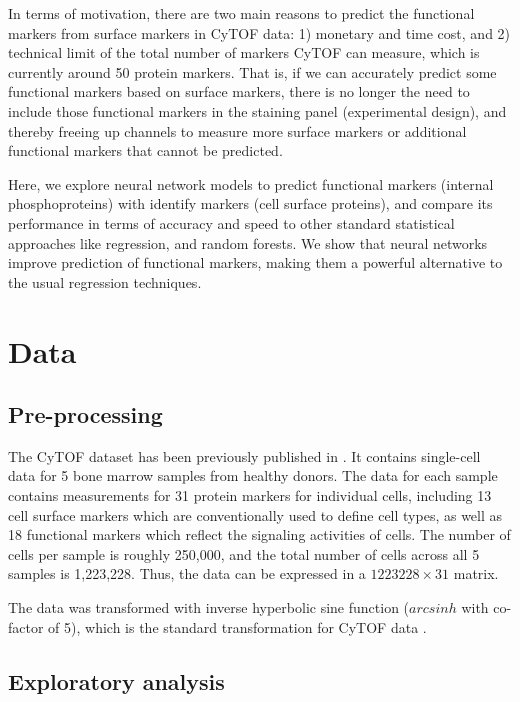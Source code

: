 \documentclass[graybox]{svmult}
\begin{document}
In terms of motivation, there are two main reasons to predict the functional markers from surface markers in CyTOF data: 1) monetary and time cost, and 2) technical limit of the total number of markers CyTOF can measure, which is currently around 50 protein markers. That is, if we can accurately predict some functional markers based on surface markers, there is no longer the need to include those functional markers in the staining panel (experimental design), and thereby freeing up channels to measure more surface markers or additional functional markers that cannot be predicted.


Here, we explore neural network models to predict functional markers
(internal phosphoproteins) with identify markers (cell surface
proteins), and compare its performance in terms of accuracy and speed
to other standard statistical approaches like regression, and random
forests.  We show that neural networks improve prediction of
functional markers, making them a powerful alternative to the usual
regression techniques.



\section{Data}

\subsection{Pre-processing}

The CyTOF dataset has been previously published in
\cite{Bendall2011,Qiu2011}. It contains single-cell data for 5 bone marrow samples from healthy donors. The data for each sample contains measurements for 31 protein markers for individual cells, including 13 cell surface markers which are conventionally used to define cell types, as well as 18 functional markers which reflect the signaling activities of cells. The number of cells per sample is roughly 250,000, and the total number of cells across all 5 samples is 1,223,228. Thus, the data can be expressed in a $1223228 \times 31$
matrix.

The data was transformed with inverse hyperbolic sine function
($arcsinh$ with co-factor of 5), which is the standard transformation
for CyTOF data \cite{Bendall2011}.


\subsection{Exploratory analysis}
\end{document}
